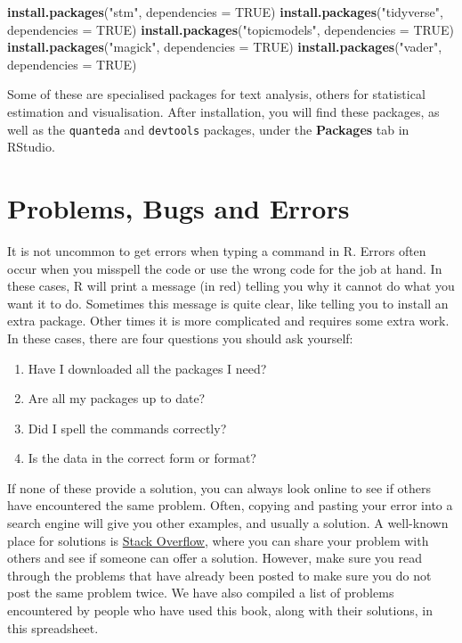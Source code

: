 \documentclass[
]{book}
\newenvironment{Shaded}{\begin{snugshade}}{\end{snugshade}}
\newcommand{\AttributeTok}[1]{\textcolor[rgb]{0.13,0.29,0.53}{#1}}
\newcommand{\ConstantTok}[1]{\textcolor[rgb]{0.56,0.35,0.01}{#1}}
\newcommand{\FunctionTok}[1]{\textcolor[rgb]{0.13,0.29,0.53}{\textbf{#1}}}
\newcommand{\NormalTok}[1]{#1}
\newcommand{\StringTok}[1]{\textcolor[rgb]{0.31,0.60,0.02}{#1}}
\providecommand{\tightlist}{%
  \setlength{\itemsep}{0pt}\setlength{\parskip}{0pt}}
\begin{document}
\begin{Shaded}
\begin{Highlighting}[]
\FunctionTok{install.packages}\NormalTok{(}\StringTok{"stm"}\NormalTok{, }\AttributeTok{dependencies =} \ConstantTok{TRUE}\NormalTok{)}
\FunctionTok{install.packages}\NormalTok{(}\StringTok{"tidyverse"}\NormalTok{, }\AttributeTok{dependencies =} \ConstantTok{TRUE}\NormalTok{)}
\FunctionTok{install.packages}\NormalTok{(}\StringTok{"topicmodels"}\NormalTok{, }\AttributeTok{dependencies =} \ConstantTok{TRUE}\NormalTok{)}
\FunctionTok{install.packages}\NormalTok{(}\StringTok{"magick"}\NormalTok{, }\AttributeTok{dependencies =} \ConstantTok{TRUE}\NormalTok{)}
\FunctionTok{install.packages}\NormalTok{(}\StringTok{"vader"}\NormalTok{, }\AttributeTok{dependencies =} \ConstantTok{TRUE}\NormalTok{)}
\end{Highlighting}
\end{Shaded}

Some of these are specialised packages for text analysis, others for statistical estimation and visualisation. After installation, you will find these packages, as well as the \texttt{quanteda} and \texttt{devtools} packages, under the \textbf{Packages} tab in RStudio.

\section{Problems, Bugs and Errors}\label{problems-bugs-and-errors}

It is not uncommon to get errors when typing a command in R. Errors often occur when you misspell the code or use the wrong code for the job at hand. In these cases, R will print a message (in red) telling you why it cannot do what you want it to do. Sometimes this message is quite clear, like telling you to install an extra package. Other times it is more complicated and requires some extra work. In these cases, there are four questions you should ask yourself:

\begin{enumerate}
\def\labelenumi{\arabic{enumi}.}
\tightlist
\item
  Have I downloaded all the packages I need?
\item
  Are all my packages up to date?
\item
  Did I spell the commands correctly?
\item
  Is the data in the correct form or format?
\end{enumerate}

If none of these provide a solution, you can always look online to see if others have encountered the same problem. Often, copying and pasting your error into a search engine will give you other examples, and usually a solution. A well-known place for solutions is \href{https://stackoverflow.com/}{Stack Overflow}, where you can share your problem with others and see if someone can offer a solution. However, make sure you read through the problems that have already been posted to make sure you do not post the same problem twice. We have also compiled a list of problems encountered by people who have used this book, along with their solutions, in this spreadsheet.
\end{document}
